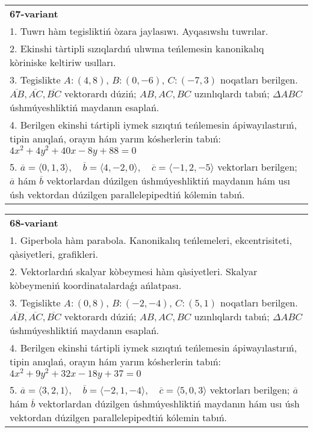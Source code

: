 \documentclass{article}
\begin{document}
\begin{tabular}{m{17cm}}
\textbf{67-variant}\\
1. Tuwrı hàm tegisliktiń òzara jaylasıwı. Ayqasıwshı tuwrılar.\\

2. Ekinshi tàrtipli sızıqlardıń ulıwma teńlemesin kanonikalıq kòriniske keltiriw usılları.\\

3. Tegislikte $A: (4, 8)$, $B: (0, -6)$, $C: (-7, 3)$ noqatları berilgen. $\overline{AB}, \overline{AC}, \overline{BC}$ vektorardı dúziń; $AB, AC, BC$ uzınlıqlardı tabıń; $\Delta ABC$ úshmúyeshliktiń maydanın esaplań. \\

4. Berilgen ekinshi tártipli iymek sızıqtıń teńlemesin ápiwayılastırıń, tipin anıqlań, orayın hám yarım kósherlerin tabıń: $4x^2+4y^2+40x-8y+88=0$\\

5. \(\overline{a} = \langle 0, 1, 3 \rangle, \quad \overline{b} = \langle 4, -2, 0 \rangle, \quad \overline{c} = \langle -1, 2, -5 \rangle\) vektorları berilgen; \(\overline{a}\) hám \(\overline{b}\) vektorlardan dúzilgen úshmúyeshliktiń maydanın hám usı úsh vektordan dúzilgen parallelepipedtiń kólemin tabıń.
\end{tabular}
\vspace{1cm}


\begin{tabular}{m{17cm}}
\textbf{68-variant}\\
1. Giperbola hàm parabola. Kanonikalıq teńlemeleri, ekcentrisiteti, qàsiyetleri, grafikleri.\\

2. Vektorlardıń skalyar kòbeymesi hàm qàsiyetleri. Skalyar kòbeymeniń koordinatalardaǵı ańlatpası.\\

3. Tegislikte $A: (0, 8)$, $B: (-2, -4)$, $C: (5, 1)$ noqatları berilgen. $\overline{AB}, \overline{AC}, \overline{BC}$ vektorardı dúziń; $AB, AC, BC$ uzınlıqlardı tabıń; $\Delta ABC$ úshmúyeshliktiń maydanın esaplań. \\

4. Berilgen ekinshi tártipli iymek sızıqtıń teńlemesin ápiwayılastırıń, tipin anıqlań, orayın hám yarım kósherlerin tabıń: $4x^2+9y^2+32x-18y+37=0$\\

5. \(\overline{a} = \langle 3, 2, 1 \rangle, \quad \overline{b} = \langle -2, 1, -4 \rangle, \quad \overline{c} = \langle 5, 0, 3 \rangle\) vektorları berilgen; \(\overline{a}\) hám \(\overline{b}\) vektorlardan dúzilgen úshmúyeshliktiń maydanın hám usı úsh vektordan dúzilgen parallelepipedtiń kólemin tabıń.
\end{tabular}
\vspace{1cm}
\end{document}
